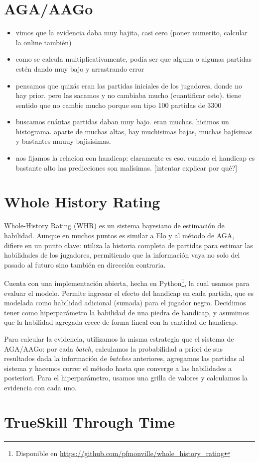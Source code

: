 \documentclass[a4paper,10pt]{report}
\begin{document}
\section*{AGA/AAGo}
\begin{itemize}
  \item vimos que la evidencia daba muy bajita, casi cero (poner numerito, calcular la online también)
  \item como se calcula multiplicativamente, podía ser que alguna o algunas partidas estén dando muy bajo y arrastrando error
  \item pensamos que quizás eran las partidas iniciales de los jugadores, donde no hay prior. pero las sacamos y no cambiaba mucho (cuantificar esto). tiene sentido que no cambie mucho porque son tipo 100 partidas de 3300
  \item buscamos cuántas partidas daban muy bajo. eran muchas. hicimos un histograma. aparte de muchas altas, hay muchisimas bajas, muchas bajísimas y bastantes muuuy bajisisimas.
  \item nos fijamos la relacion con handicap: claramente es eso. cuando el handicap es bastante alto las predicciones son malísimas. [intentar explicar por qué?]
\end{itemize}



\section*{Whole History Rating}

Whole-History Rating (WHR)  es un sistema bayesiano de estimación de habilidad. Aunque en muchos puntos es similar a Elo y al método de AGA, difiere en un punto clave: utiliza la historia completa de partidas para estimar las habilidades de los jugadores, permitiendo que la información vaya no solo del pasado al futuro sino también en dirección contraria.

Cuenta con una implementación abierta, hecha en Python\footnote{Disponible en \url{https://github.com/pfmonville/whole_history_rating}}, la cual usamos para evaluar el modelo. Permite ingresar el efecto del handicap en cada partida, que es modelada como habilidad adicional (sumada) para el jugador negro. Decidimos tener como hiperparámetro la habilidad de una piedra de handicap, y asumimos que la habilidad agregada crece de forma lineal con la cantidad de handicap.

Para calcular la evidencia, utilizamos la misma estrategia que el sistema de AGA/AAGo: por cada \textit{batch}, calculamos la probabilidad a priori de sus resultados dada la información de \textit{batches} anteriores, agregamos las partidas al sistema y hacemos correr el método hasta que converge a las habilidades a posteriori. Para el hiperparámetro, usamos una grilla de valores y calculamos la evidencia con cada uno.

\section*{TrueSkill Through Time}


\end{document}
